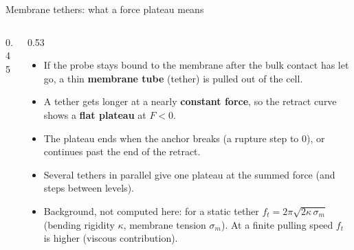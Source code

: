 \documentclass[aspectratio=169,9pt]{beamer}
\begin{document}
\begin{frame}{Membrane tethers: what a force plateau means}
\begin{columns}[T]
\begin{column}{0.45\textwidth}
\centering
{}
\end{column}
\begin{column}{0.53\textwidth}\small
\begin{itemize}
\item If the probe stays bound to the membrane after the bulk contact has let go, a thin \textbf{membrane tube} (tether) is pulled out of the cell.
\item A tether gets longer at a nearly \textbf{constant force}, so the retract curve shows a \textbf{flat plateau} at $F<0$.
\item The plateau ends when the anchor breaks (a rupture step to 0), or continues past the end of the retract.
\item Several tethers in parallel give one plateau at the summed force (and steps between levels).
\item Background, not computed here: for a static tether $f_t=2\pi\sqrt{2\kappa\,\sigma_m}$ (bending rigidity $\kappa$, membrane tension $\sigma_m$). At a finite pulling speed $f_t$ is higher (viscous contribution).
\end{itemize}
\end{column}
\end{columns}
\end{frame}
\end{document}
